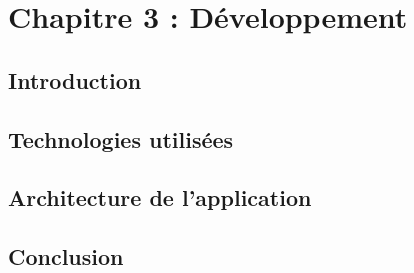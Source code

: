 \chapter{Chapitre 3 : Développement}

\section*{Introduction}
{}
\paragraph{}
\lipsum[1]

    \section{Technologies utilisées}
    \paragraph{}
    \lipsum[1-2]
    \section{Architecture de l'application}
    \paragraph{}
    \lipsum[1-2]


\section*{Conclusion}
\paragraph{}
\lipsum[1]